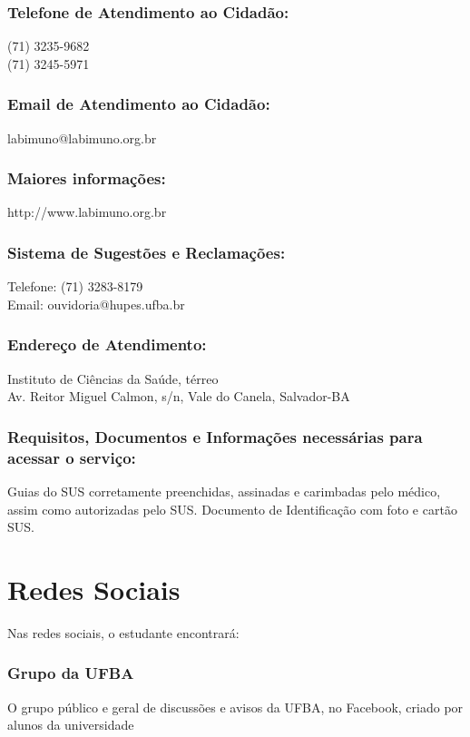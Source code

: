     \subsubsection {Telefone de Atendimento ao Cidadão:}
        (71) 3235-9682 \\
        (71) 3245-5971
        
    \subsubsection {Email de Atendimento ao Cidadão:}
        labimuno@labimuno.org.br
        
    \subsubsection{Maiores informações:}
        http://www.labimuno.org.br
   
    \subsubsection{Sistema de Sugestões e Reclamações:}
        Telefone: (71) 3283-8179 \\
        Email: ouvidoria@hupes.ufba.br

    \subsubsection{Endereço de Atendimento:}
        Instituto de Ciências da Saúde, térreo \\
        Av. Reitor Miguel Calmon, s/n, Vale do Canela, Salvador-BA
        
    \subsubsection{Requisitos, Documentos e Informações necessárias para acessar o serviço:}   
        Guias do SUS corretamente preenchidas, assinadas e carimbadas pelo médico, assim como autorizadas pelo SUS. Documento de Identificação com foto e cartão SUS.

\section{Redes Sociais}
    Nas redes sociais, o estudante encontrará:
    
        \subsubsection{Grupo da UFBA}
        O grupo público e geral de discussões e avisos da UFBA, no Facebook, criado por alunos da universidade

